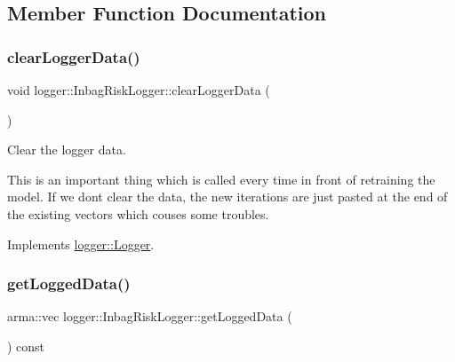 \subsection{Member Function Documentation}
\mbox{\label{classlogger_1_1_inbag_risk_logger_aecdde2764203ec24ca360846538ce3c6}} 
\subsubsection{\texorpdfstring{clear\+Logger\+Data()}{clearLoggerData()}}
{\footnotesize\ttfamily void logger\+::\+Inbag\+Risk\+Logger\+::clear\+Logger\+Data (\begin{DoxyParamCaption}{ }\end{DoxyParamCaption})\hspace{0.3cm}{\ttfamily [virtual]}}



Clear the logger data. 

This is an important thing which is called every time in front of retraining the model. If we don\textquotesingle{}t clear the data, the new iterations are just pasted at the end of the existing vectors which couses some troubles. 

Implements \mbox{\hyperlink{classlogger_1_1_logger_a8c68db2430fa84b67528bfa6ae45a516}{logger\+::\+Logger}}.

\mbox{\label{classlogger_1_1_inbag_risk_logger_af69f22c25521341a26152692bd03183a}} 
\subsubsection{\texorpdfstring{get\+Logged\+Data()}{getLoggedData()}}
{\footnotesize\ttfamily arma\+::vec logger\+::\+Inbag\+Risk\+Logger\+::get\+Logged\+Data (\begin{DoxyParamCaption}{ }\end{DoxyParamCaption}) const\hspace{0.3cm}{\ttfamily [virtual]}}



